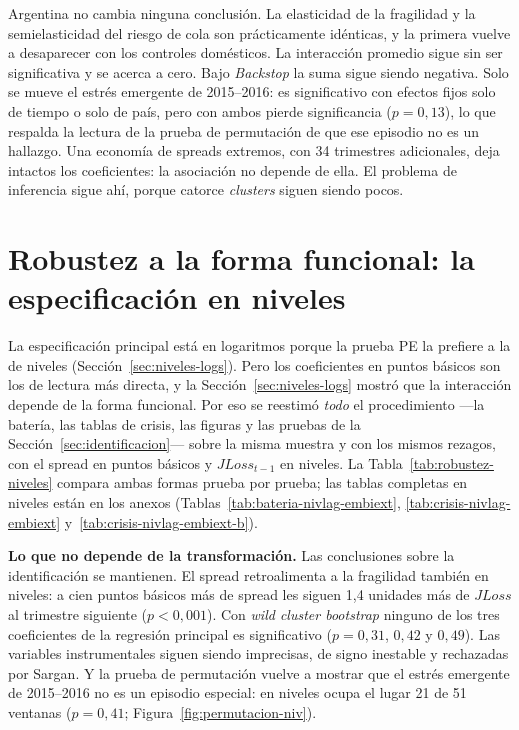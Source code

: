 Argentina no cambia ninguna conclusión. La elasticidad de la fragilidad y la semielasticidad del riesgo de cola son prácticamente idénticas, y la primera vuelve a desaparecer con los controles domésticos. La interacción promedio sigue sin ser significativa y se acerca a cero. Bajo \textit{Backstop} la suma sigue siendo negativa. Solo se mueve el estrés emergente de 2015--2016: es significativo con efectos fijos solo de tiempo o solo de país, pero con ambos pierde significancia ($p=0{,}13$), lo que respalda la lectura de la prueba de permutación de que ese episodio no es un hallazgo. Una economía de spreads extremos, con 34 trimestres adicionales, deja intactos los coeficientes: la asociación no depende de ella. El problema de inferencia sigue ahí, porque catorce \textit{clusters} siguen siendo pocos.

\section{Robustez a la forma funcional: la especificación en niveles}
\label{sec:robustez-niveles}

La especificación principal está en logaritmos porque la prueba PE la prefiere a la de niveles (Sección~\ref{sec:niveles-logs}). Pero los coeficientes en puntos básicos son los de lectura más directa, y la Sección~\ref{sec:niveles-logs} mostró que la interacción depende de la forma funcional. Por eso se reestimó \emph{todo} el procedimiento ---la batería, las tablas de crisis, las figuras y las pruebas de la Sección~\ref{sec:identificacion}--- sobre la misma muestra y con los mismos rezagos, con el spread en puntos básicos y $JLoss_{t-1}$ en niveles. La Tabla~\ref{tab:robustez-niveles} compara ambas formas prueba por prueba; las tablas completas en niveles están en los anexos (Tablas~\ref{tab:bateria-nivlag-embiext}, \ref{tab:crisis-nivlag-embiext} y~\ref{tab:crisis-nivlag-embiext-b}).



\textbf{Lo que no depende de la transformación.} Las conclusiones sobre la identificación se mantienen. El spread retroalimenta a la fragilidad también en niveles: a cien puntos básicos más de spread les siguen 1,4 unidades más de $JLoss$ al trimestre siguiente ($p<0{,}001$). Con \textit{wild cluster bootstrap} ninguno de los tres coeficientes de la regresión principal es significativo ($p=0{,}31$, $0{,}42$ y $0{,}49$). Las variables instrumentales siguen siendo imprecisas, de signo inestable y rechazadas por Sargan. Y la prueba de permutación vuelve a mostrar que el estrés emergente de 2015--2016 no es un episodio especial: en niveles ocupa el lugar 21 de 51 ventanas ($p=0{,}41$; Figura~\ref{fig:permutacion-niv}).


